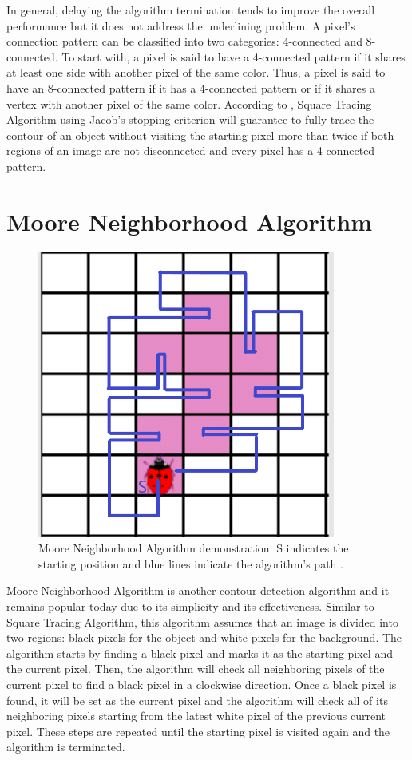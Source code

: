 \documentclass[conference]{IEEEtran}
\begin{document}
In general, delaying the algorithm termination tends to improve the overall performance but it does not address the underlining problem. A pixel's connection pattern can be classified into two categories: 4-connected and 8-connected. To start with, a pixel is said to have a 4-connected pattern if it shares at least one side with another pixel of the same color. Thus, a pixel is said to have an 8-connected pattern if it has a 4-connected pattern or if it shares a vertex with another pixel of the same color. According to \cite{sta:2000}, Square Tracing Algorithm using Jacob's stopping criterion will guarantee to fully trace the contour of an object without visiting the starting pixel more than twice if both regions of an image are not disconnected and every pixel has a 4-connected pattern.

\section{Moore Neighborhood Algorithm}

\begin{figure}[!htb]
    \centering
    \includegraphics[scale = 0.5]{fig4.png}
    \caption{Moore Neighborhood Algorithm demonstration. S indicates the starting position and blue lines indicate the algorithm's path \cite{mnt:2000}.}
\end{figure}

Moore Neighborhood Algorithm is another contour detection algorithm and it remains popular today due to its simplicity and its effectiveness. Similar to Square Tracing Algorithm, this algorithm assumes that an image is divided into two regions: black pixels for the object and white pixels for the background. The algorithm starts by finding a black pixel and marks it as the starting pixel and the current pixel. Then, the algorithm will check all neighboring pixels of the current pixel to find a black pixel in a clockwise direction. Once a black pixel is found, it will be set as the current pixel and the algorithm will check all of its neighboring pixels starting from the latest white pixel of the previous current pixel. These steps are repeated until the starting pixel is visited again and the algorithm is terminated.
\end{document}
